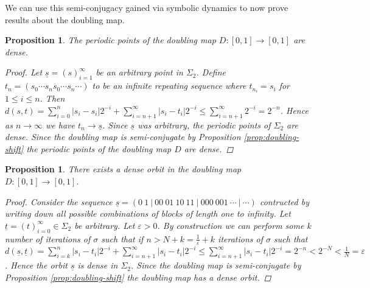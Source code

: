\documentclass[11pt,a4paper,oneside]{memoir}
\theoremstyle{plain}
\newtheorem{prop}[thm]{Proposition}
\theoremstyle{definition}
\begin{document}
We can use this semi-conjugacy gained via symbolic dynamics to now prove results about the doubling map. 

\begin{prop}
    The periodic points of the doubling map $D: [0, 1] \to [0, 1]$ are dense.
    \begin{proof}
        Let $\underline{s} = (s)_{i=1}^{\infty}$ be an arbitrary point in $\Sigma_2$. Define $t_n = (s_0\cdots s_ns_0\cdots s_n\cdots)$ to be an infinite repeating sequence where $t_{n_i} = s_i$ for $1 \leq i \leq n$. Then $d(s, t) = \sum_{i = 0}^n|s_i - s_i|2^{-i} + \sum_{i=n+1}^{\infty}|s_i - t_i|2^{-i} \leq \sum_{i = n+1}^{\infty}2^{-i} = 2^{-n}$. Hence as $n \to \infty$ we have $t_n \to \underline{s}$. Since $\underline{s}$ was arbitrary, the periodic points of $\Sigma_2$ are dense. Since the doubling map is semi-conjugate by Proposition \ref{prop:doubling-shift} the periodic points of the doubling map $D$ are dense.
    \end{proof}
\end{prop}

\begin{prop}
    There exists a dense orbit in the doubling map $D: [0, 1] \to [0, 1]$.
    \begin{proof}
        Consider the sequence $\underline{s} = (0\ 1\ |\ 00\ 01\ 10\ 11\ |\ 000\ 001\ \cdots\ |\ \cdots)$ contructed by writing down all possible combinations of blocks of length one to infinity. Let $\underline{t} = (t)_{i=0}^{\infty} \in \Sigma_2$ be arbitrary. Let $\varepsilon > 0$. By construction we can perform some $k$ number of iterations of $\sigma$ such that if $n > N + k = \frac{1}{\varepsilon} + k$ iterations of $\sigma$ such that $d(\underline{s}, \underline{t}) = \sum_{i = k}^{n}|s_i - t_i|2^{-i} + \sum_{i = n+1}^{\infty}|s_i - t_i|2^{-i} \leq \sum_{i = n+1}^{\infty}|s_i - t_i|2^{-i} = 2^{-n} < 2^{-N} < \frac{1}{N} = \varepsilon$. Hence the orbit $\underline{s}$ is dense in $\Sigma_2$. Since the doubling map is semi-conjugate by Proposition \ref{prop:doubling-shift} the doubling map has a dense orbit.
    \end{proof}
\end{prop}
\end{document}

